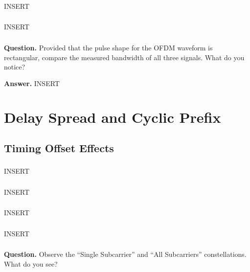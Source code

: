 \documentclass[11pt,a4paper]{article}
\begin{document}
\subsubsection{ }
INSERT

\subsubsection{ }
INSERT

\subsubsection{ }
\noindent\textbf{Question.} Provided that the pulse shape for the OFDM waveform is rectangular, compare the measured bandwidth of all three signals. What do you notice?

\noindent\textbf{Answer.} INSERT

\section{Delay Spread and Cyclic Prefix}

\subsection{Timing Offset Effects}

\subsubsection{ }
INSERT

\subsubsection{ }
INSERT

\subsubsection{ }
INSERT

\subsubsection{ }
INSERT

\subsubsection{ }
\noindent\textbf{Question.} Observe the “Single Subcarrier” and “All Subcarriers” constellations. What do you see?
\end{document}
